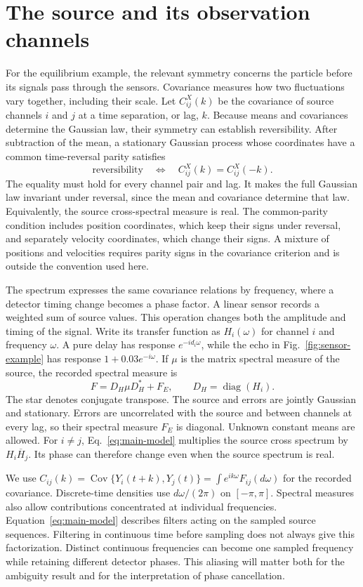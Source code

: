 \section{The source and its observation channels}\label{sec:observation}
For the equilibrium example, the relevant symmetry concerns the particle before its signals pass through the sensors. Covariance measures how two fluctuations vary together, including their scale. Let $C^X_{ij}(k)$ be the covariance of source channels $i$ and $j$ at a time separation, or lag, $k$. Because means and covariances determine the Gaussian law, their symmetry can establish reversibility. After subtraction of the mean, a stationary Gaussian process whose coordinates have a common time-reversal parity satisfies
\[
 \text{reversibility}\quad\Longleftrightarrow\quad
 C^X_{ij}(k)=C^X_{ij}(-k).
\]
The equality must hold for every channel pair and lag. It makes the full Gaussian law invariant under reversal, since the mean and covariance determine that law. Equivalently, the source cross-spectral measure is real. The common-parity condition includes position coordinates, which keep their signs under reversal, and separately velocity coordinates, which change their signs. A mixture of positions and velocities requires parity signs in the covariance criterion and is outside the convention used here.

The spectrum expresses the same covariance relations by frequency, where a detector timing change becomes a phase factor. A linear sensor records a weighted sum of source values. This operation changes both the amplitude and timing of the signal. Write its transfer function as $H_i(\omega)$ for channel $i$ and frequency $\omega$. A pure delay has response $e^{-id_i\omega}$, while the echo in Fig.~\ref{fig:sensor-example} has response $1+0.03e^{-i\omega}$. If $\mu$ is the matrix spectral measure of the source, the recorded spectral measure is
\begin{equation}
 F=D_H\mu D_H^*+F_E,\qquad D_H=\operatorname{diag}(H_i).
 \label{eq:main-model}
\end{equation}
The star denotes conjugate transpose. The source and errors are jointly Gaussian and stationary. Errors are uncorrelated with the source and between channels at every lag, so their spectral measure $F_E$ is diagonal. Unknown constant means are allowed. For $i\ne j$, Eq.~\eqref{eq:main-model} multiplies the source cross spectrum by $H_i\overline H_j$. Its phase can therefore change even when the source spectrum is real.

We use $C_{ij}(k)=\operatorname{Cov}\{Y_i(t+k),Y_j(t)\}=\int e^{ik\omega}F_{ij}(d\omega)$ for the recorded covariance. Discrete-time densities use $d\omega/(2\pi)$ on $[-\pi,\pi]$. Spectral measures also allow contributions concentrated at individual frequencies. Equation~\eqref{eq:main-model} describes filters acting on the sampled source sequences. Filtering in continuous time before sampling does not always give this factorization. Distinct continuous frequencies can become one sampled frequency while retaining different detector phases. This aliasing will matter both for the ambiguity result and for the interpretation of phase cancellation.

